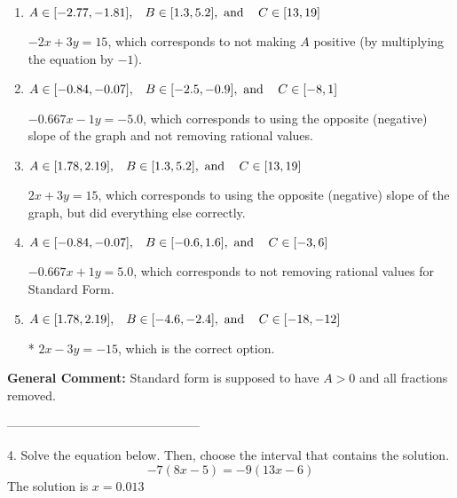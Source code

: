 \documentclass{extbook}[14pt]
\begin{document}
\begin{enumerate}[label=\Alph*.] 
\item $ A \in [-2.77, -1.81], \hspace{3mm} B \in [1.3, 5.2], \text{ and } \hspace{3mm} C \in [13, 19] $ 

  $-2x + 3y = 15$, which corresponds to not making $A$ positive (by multiplying the equation by $-1$). 
\item $ A \in [-0.84, -0.07], \hspace{3mm} B \in [-2.5, -0.9], \text{ and } \hspace{3mm} C \in [-8, 1] $ 

  $-0.667x - 1y = -5.0$, which corresponds to using the opposite (negative) slope of the graph and not removing rational values. 
\item $ A \in [1.78, 2.19], \hspace{3mm} B \in [1.3, 5.2], \text{ and } \hspace{3mm} C \in [13, 19] $ 

  $2x + 3y = 15$, which corresponds to using the opposite (negative) slope of the graph, but did everything else correctly. 
\item $ A \in [-0.84, -0.07], \hspace{3mm} B \in [-0.6, 1.6], \text{ and } \hspace{3mm} C \in [-3, 6] $ 

  $-0.667x + 1y = 5.0$, which corresponds to not removing rational values for Standard Form. 
\item $ A \in [1.78, 2.19], \hspace{3mm} B \in [-4.6, -2.4], \text{ and } \hspace{3mm} C \in [-18, -12] $ 

 * $2x - 3y = -15$, which is the correct option. 
\end{enumerate} 
 
\textbf{General Comment:} Standard form is supposed to have $A > 0$ and all fractions removed. 

-----------------------------------------------

4. Solve the equation below. Then, choose the interval that contains the solution.
\[ -7(8x -5) = -9(13x -6) \] 
The solution is $ x = 0.013 $ 
\end{document}
